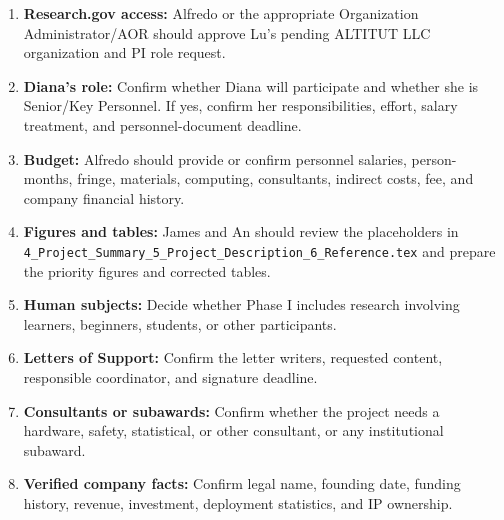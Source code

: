 \documentclass[11pt,letterpaper]{article}
\begin{document}
\begin{enumerate}[leftmargin=0.3in]
    \item \textbf{Research.gov access:}
    Alfredo or the appropriate Organization Administrator/AOR should approve
    Lu's pending ALTITUT LLC organization and PI role request.

    \item \textbf{Diana's role:}
    Confirm whether Diana will participate and whether she is Senior/Key
    Personnel. If yes, confirm her responsibilities, effort, salary treatment,
    and personnel-document deadline.

    \item \textbf{Budget:}
    Alfredo should provide or confirm personnel salaries, person-months,
    fringe, materials, computing, consultants, indirect costs, fee, and
    company financial history.

    \item \textbf{Figures and tables:}
    James and An should review the placeholders in
    \texttt{4\_Project\_Summary\_5\_Project\_Description\_6\_Reference.tex}
    and prepare the priority figures and corrected tables.

    \item \textbf{Human subjects:}
    Decide whether Phase I includes research involving learners, beginners,
    students, or other participants.

    \item \textbf{Letters of Support:}
    Confirm the letter writers, requested content, responsible coordinator,
    and signature deadline.

    \item \textbf{Consultants or subawards:}
    Confirm whether the project needs a hardware, safety, statistical, or
    other consultant, or any institutional subaward.

    \item \textbf{Verified company facts:}
    Confirm legal name, founding date, funding history, revenue, investment,
    deployment statistics, and IP ownership.
\end{enumerate}
\end{document}
